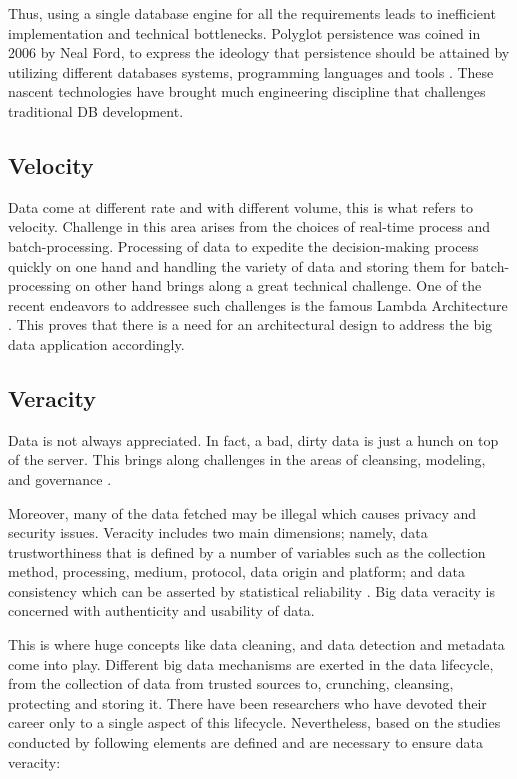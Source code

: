 Thus, using a single database engine for all the requirements leads to inefficient implementation and technical bottlenecks. Polyglot persistence was coined in 2006 by Neal Ford, to express the ideology that persistence should be attained by utilizing different databases systems, programming languages and tools \cite{Sadalage2013}. These nascent technologies have brought much engineering discipline that challenges traditional DB development.

\subsection{Velocity}

Data come at different rate and with different volume, this is what refers to velocity. Challenge in this area arises from the choices of real-time process and batch-processing. Processing of data to expedite the decision-making process quickly on one hand and handling the variety of data and storing them for batch-processing on other hand brings along a great technical challenge. One of the recent endeavors to addressee such challenges is the famous Lambda Architecture \cite{Marz2015}. This proves that there is a need for an architectural design to address the big data application accordingly.

\subsection{Veracity}

Data is not always appreciated. In fact, a bad, dirty data is just a hunch on top of the server. This brings along challenges in the areas of cleansing, modeling, and governance \cite{Chen2016b}.

Moreover, many of the data fetched may be illegal which causes privacy and security issues. Veracity includes two main dimensions; namely, data trustworthiness that is defined by a number of variables such as the collection method, processing, medium, protocol, data origin and platform; and data consistency which can be asserted by statistical reliability \cite{Demchenko2013}. Big data veracity is concerned with authenticity and usability of data.

This is where huge concepts like data cleaning, and data detection and metadata come into play. Different big data mechanisms are exerted in the data lifecycle, from the collection of data from trusted sources to, crunching, cleansing, protecting and storing it. There have been researchers who have devoted their career only to a single aspect of this lifecycle. Nevertheless, based on the studies conducted by \citeauthor{Kaisler2013,Demchenko2013,Snijders2012,Bughin2016,Chen2017} following elements are defined and are necessary to ensure data veracity:

